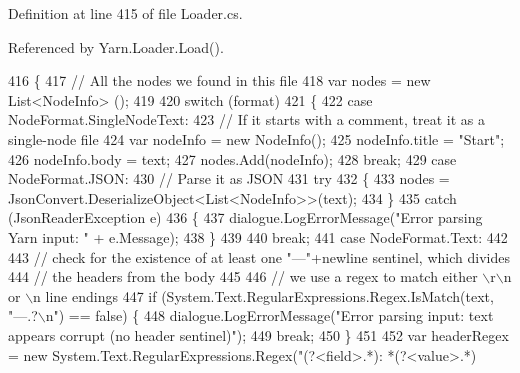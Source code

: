 Definition at line 415 of file Loader.\-cs.



Referenced by Yarn.\-Loader.\-Load().


\begin{DoxyCode}
416         \{
417             \textcolor{comment}{// All the nodes we found in this file}
418             var nodes = \textcolor{keyword}{new} List<NodeInfo> ();
419 
420             \textcolor{keywordflow}{switch} (format)
421             \{
422                 \textcolor{keywordflow}{case} NodeFormat.SingleNodeText:
423                     \textcolor{comment}{// If it starts with a comment, treat it as a single-node file}
424                     var nodeInfo = \textcolor{keyword}{new} NodeInfo();
425                     nodeInfo.title = \textcolor{stringliteral}{"Start"};
426                     nodeInfo.body = text;
427                     nodes.Add(nodeInfo);
428                     \textcolor{keywordflow}{break};
429                 \textcolor{keywordflow}{case} NodeFormat.JSON:
430                     \textcolor{comment}{// Parse it as JSON}
431                     \textcolor{keywordflow}{try}
432                     \{
433                         nodes = JsonConvert.DeserializeObject<List<NodeInfo>>(text);
434                     \}
435                     \textcolor{keywordflow}{catch} (JsonReaderException e)
436                     \{
437                         dialogue.LogErrorMessage(\textcolor{stringliteral}{"Error parsing Yarn input: "} + e.Message);
438                     \}
439 
440                     \textcolor{keywordflow}{break};
441                 \textcolor{keywordflow}{case} NodeFormat.Text:
442 
443                     \textcolor{comment}{// check for the existence of at least one "---"+newline sentinel, which divides}
444                     \textcolor{comment}{// the headers from the body}
445 
446                     \textcolor{comment}{// we use a regex to match either \(\backslash\)r\(\backslash\)n or \(\backslash\)n line endings}
447                     \textcolor{keywordflow}{if} (System.Text.RegularExpressions.Regex.IsMatch(text, \textcolor{stringliteral}{"---.?\(\backslash\)n"}) == \textcolor{keyword}{false}) \{
448                         dialogue.LogErrorMessage(\textcolor{stringliteral}{"Error parsing input: text appears corrupt (no header
       sentinel)"});
449                         \textcolor{keywordflow}{break};
450                     \}
451 
452                     var headerRegex = \textcolor{keyword}{new} System.Text.RegularExpressions.Regex(\textcolor{stringliteral}{"(?<field>.*): *(?<value>.*)
}
\end{DoxyCode}

